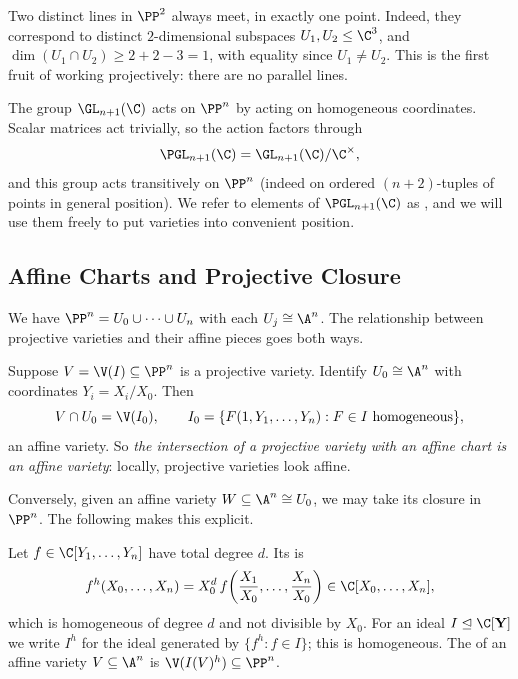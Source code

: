 \begin{example}
	Two distinct lines in $\PP^2$ always meet, in exactly one point. Indeed, they correspond to distinct $2$-dimensional subspaces $U_1, U_2 \leq \C^3$, and $\dim(U_1 \cap U_2) \geq 2 + 2 - 3 = 1$, with equality since $U_1 \neq U_2$. This is the first fruit of working projectively: there are no parallel lines.
\end{example}

The group $\GL_{n+1}(\C)$ acts on $\PP^n$ by acting on homogeneous coordinates. Scalar matrices act trivially, so the action factors through
$$\PGL_{n+1}(\C) = \GL_{n+1}(\C)/\C^\times,$$
and this group acts transitively on $\PP^n$ (indeed on ordered $(n+2)$-tuples of points in general position). We refer to elements of $\PGL_{n+1}(\C)$ as , and we will use them freely to put varieties into convenient position.

\subsection{Affine Charts and Projective Closure}

We have $\PP^n = U_0 \cup \cdots \cup U_n$ with each $U_j \cong \A^n$. The relationship between projective varieties and their affine pieces goes both ways.

Suppose $V = \V(I) \subseteq \PP^n$ is a projective variety. Identify $U_0 \cong \A^n$ with coordinates $Y_i = X_i/X_0$. Then
$$V \cap U_0 = \V(I_0), \qquad I_0 = \{F(1,Y_1,\dots,Y_n) : F \in I \text{ homogeneous}\},$$
an affine variety. So \emph{the intersection of a projective variety with an affine chart is an affine variety}: locally, projective varieties look affine.

Conversely, given an affine variety $W \subseteq \A^n \cong U_0$, we may take its closure in $\PP^n$. The following makes this explicit.

\begin{definition}[Homogenisation]
	Let $f \in \C[Y_1,\dots,Y_n]$ have total degree $d$. Its  is
	$$f^h(X_0,\dots,X_n) = X_0^{d}\, f\!\left(\frac{X_1}{X_0},\dots,\frac{X_n}{X_0}\right) \in \C[X_0,\dots,X_n],$$
	which is homogeneous of degree $d$ and not divisible by $X_0$. For an ideal $I \trianglelefteq \C[\mathbf Y]$ we write $I^h$ for the ideal generated by $\{f^h : f \in I\}$; this is homogeneous. The  of an affine variety $V \subseteq \A^n$ is $\V(I(V)^h) \subseteq \PP^n$.
\end{definition}

